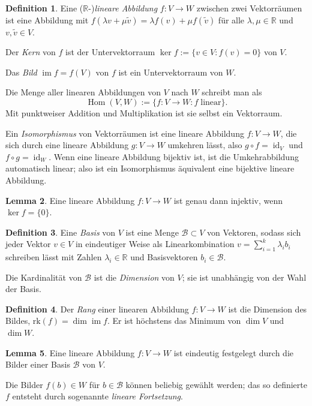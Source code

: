 \documentclass[a4paper]{scrreprt}
\numberwithin{equation}{chapter}
\DeclareMathOperator{\id}{id}
\DeclareMathOperator{\Hom}{Hom}
\DeclareMathOperator{\im}{im}
\newcommand{\R}{\mathbb{R}}
\theoremstyle{definition}
\newtheorem{defn}{Definition}[section]
\newtheorem{lemma}[defn]{Lemma}
\begin{document}
\begin{defn}
	Eine ($\R$-)\emph{lineare Abbildung} $f\colon V\to W$ zwischen zwei Vektorräumen ist eine Abbildung mit $f(\lambda v + \mu \tilde v) = \lambda f(v) + \mu f(\tilde v)$ für alle $\lambda,\mu \in \R$ und $v,\tilde v \in V$.

	Der \emph{Kern} von $f$ ist der Untervektorraum $\ker f := \{v \in V : f(v) = 0\}$ von $V$.

	Das \emph{Bild} $\im f = f(V)$ von $f$ ist ein Untervektorraum von $W$.

	Die Menge aller linearen Abbildungen von $V$ nach $W$ schreibt man als
	\[\Hom(V,W) := \{f\colon V \to W : f \; \text{linear}\}.\]
	Mit punktweiser Addition und Multiplikation ist sie selbst ein Vektorraum.
	
	Ein \emph{Isomorphismus} von Vektorräumen ist eine lineare Abbildung $f\colon V\to W$, die sich durch eine lineare Abbildung $g\colon V\to W$ umkehren lässt, also $g\circ f = \id_V$ und $f\circ g = \id_W$. Wenn eine lineare Abbildung bijektiv ist, ist die Umkehrabbildung automatisch linear; also ist ein Isomorphismus äquivalent eine bijektive lineare Abbildung.
\end{defn}

\begin{lemma}
	Eine lineare Abbildung $f\colon V \to W$ ist genau dann injektiv, wenn $\ker f = \{0\}$.
\end{lemma}

\begin{defn}
	Eine \emph{Basis} von $V$ ist eine Menge $\mathcal B \subset V$ von Vektoren, sodass sich jeder Vektor $v \in V$ in eindeutiger Weise als Linearkombination $v = \sum_{i=1}^k \lambda_i b_i$ schreiben lässt mit Zahlen $\lambda_i \in \R$ und Basisvektoren $b_i \in \mathcal B$.

	Die Kardinalität von $\mathcal B$ ist die \emph{Dimension} von $V$; sie ist unabhängig von der Wahl der Basis.
\end{defn}

\begin{defn}
	Der \emph{Rang} einer linearen Abbildung $f\colon V\to W$ ist die Dimension des Bildes, $\mathrm{rk}(f) = \dim\im f$. Er ist höchstens das Minimum von $\dim V$ und $\dim W$.
\end{defn}

\begin{lemma}
	Eine lineare Abbildung $f\colon V\to W$ ist eindeutig festgelegt durch die Bilder einer Basis $\mathcal B$ von $V$.

	Die Bilder $f(b)\in W$ für $b \in \mathcal B$ können beliebig gewählt werden; das so definierte $f$ entsteht durch sogenannte \emph{lineare Fortsetzung}.
\end{lemma}
\end{document}
